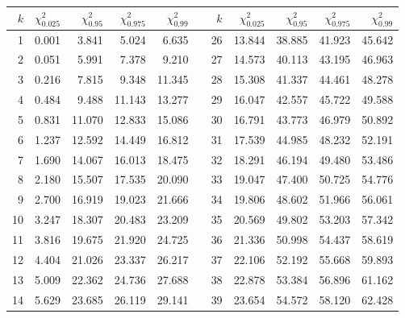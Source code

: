\begin{tabular}{@{}rrrrrcrrrrr@{}}
\toprule
$k$ & $\chi^2_{0.025}$ & $\chi^2_{0.95}$ & $\chi^2_{0.975}$ & $\chi^2_{0.99}$ & & $k$ & $\chi^2_{0.025}$ & $\chi^2_{0.95}$ & $\chi^2_{0.975}$ & $\chi^2_{0.99}$ \\
\midrule
1 & 0.001 & 3.841 & 5.024 & 6.635 & \hspace{4pt} & 26 & 13.844 & 38.885 & 41.923 & 45.642 \\
2 & 0.051 & 5.991 & 7.378 & 9.210 & \hspace{4pt} & 27 & 14.573 & 40.113 & 43.195 & 46.963 \\
3 & 0.216 & 7.815 & 9.348 & 11.345 & \hspace{4pt} & 28 & 15.308 & 41.337 & 44.461 & 48.278 \\
4 & 0.484 & 9.488 & 11.143 & 13.277 & \hspace{4pt} & 29 & 16.047 & 42.557 & 45.722 & 49.588 \\
5 & 0.831 & 11.070 & 12.833 & 15.086 & \hspace{4pt} & 30 & 16.791 & 43.773 & 46.979 & 50.892 \\
6 & 1.237 & 12.592 & 14.449 & 16.812 & \hspace{4pt} & 31 & 17.539 & 44.985 & 48.232 & 52.191 \\
7 & 1.690 & 14.067 & 16.013 & 18.475 & \hspace{4pt} & 32 & 18.291 & 46.194 & 49.480 & 53.486 \\
8 & 2.180 & 15.507 & 17.535 & 20.090 & \hspace{4pt} & 33 & 19.047 & 47.400 & 50.725 & 54.776 \\
9 & 2.700 & 16.919 & 19.023 & 21.666 & \hspace{4pt} & 34 & 19.806 & 48.602 & 51.966 & 56.061 \\
10 & 3.247 & 18.307 & 20.483 & 23.209 & \hspace{4pt} & 35 & 20.569 & 49.802 & 53.203 & 57.342 \\
11 & 3.816 & 19.675 & 21.920 & 24.725 & \hspace{4pt} & 36 & 21.336 & 50.998 & 54.437 & 58.619 \\
12 & 4.404 & 21.026 & 23.337 & 26.217 & \hspace{4pt} & 37 & 22.106 & 52.192 & 55.668 & 59.893 \\
13 & 5.009 & 22.362 & 24.736 & 27.688 & \hspace{4pt} & 38 & 22.878 & 53.384 & 56.896 & 61.162 \\
14 & 5.629 & 23.685 & 26.119 & 29.141 & \hspace{4pt} & 39 & 23.654 & 54.572 & 58.120 & 62.428 \\

\end{tabular}
